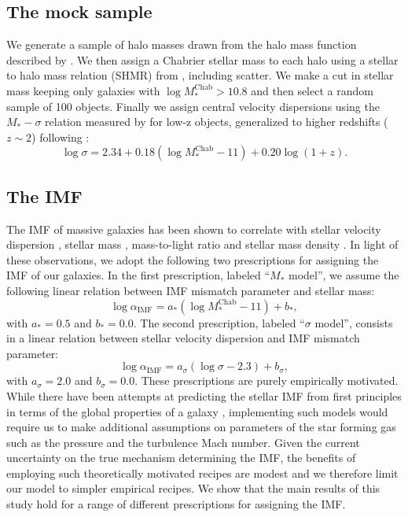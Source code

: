 \documentclass[usenatbib, letters]{mnras}
\def\mchab{M_*^{\mathrm{Chab}}}
\def\aimf{\alpha_{\mathrm{IMF}}}
\begin{document}
\subsection{The mock sample}

We generate a sample of halo masses drawn from the halo mass function described by \citet{Tin++08}.
We then assign a Chabrier stellar mass to each halo using a stellar to halo mass relation (SHMR) from \citet{Lea++12}, including scatter.
We make a cut in stellar mass keeping only galaxies with $\log{\mchab} > 10.8$ and then select a random sample of 100 objects.
Finally we assign central velocity dispersions using the $M_*-\sigma$ relation measured by \citet{Aug++10} for low-z objects, generalized to higher redshifts ($z \sim 2$) following \citet{Mas++15}:
\begin{equation}\label{eq:mason}
\log{\sigma} = 2.34 + 0.18(\log{\mchab} - 11) + 0.20\log{(1 + z)}.
\end{equation}



\subsection{The IMF}
\label{ssect:imfform}

The IMF of massive galaxies has been shown to correlate with stellar velocity dispersion \citep[e.g.]{Tre++10, CvD12, LaB++13, Spi++14, Pos++15}, stellar mass \citep{Aug++10b, Son++15}, mass-to-light ratio \citep{Cap++12} and stellar mass density \citep{Spi++15}.
In light of these observations, we adopt the following two prescriptions for assigning the IMF of our galaxies.
In the first prescription, labeled ``$M_*$ model'', we assume the following linear relation between IMF mismatch parameter and stellar mass:
\begin{equation}\label{eq:mstarmodel}
\log{\aimf} = a_*(\log{\mchab} - 11) + b_*,
\end{equation}
with $a_* = 0.5$ and $b_* = 0.0$. %
The second prescription, labeled ``$\sigma$ model'', consists in a linear relation between stellar velocity dispersion and IMF mismatch parameter:
\begin{equation}\label{eq:sigmamodel}
\log{\aimf} = a_\sigma(\log{\sigma} - 2.3) + b_\sigma,
\end{equation}
with $a_\sigma = 2.0$ and $b_\sigma = 0.0$.
These prescriptions are purely empirically motivated.
While there have been attempts at predicting the stellar IMF from first principles in terms of the global properties of a galaxy \citep[e.g.]{Kru11,Hop12}, implementing such models would require us to make additional assumptions on parameters of the star forming gas such as the pressure and the turbulence Mach number.
Given the current uncertainty on the true mechanism determining the IMF, the benefits of employing such theoretically motivated recipes are modest and we therefore limit our model to simpler empirical recipes.
We show that the main results of this study hold for a range of different prescriptions for assigning the IMF.
\end{document}
